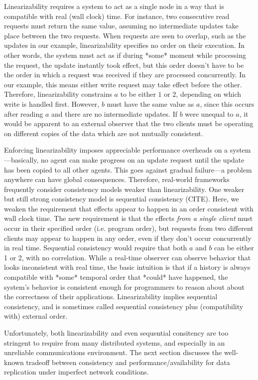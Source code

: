 Linearizability requires a system to act as a single node in a way
that is compatible with real (wall clock) time. For instance, two
consecutive read requests must return the same value, assuming no
intermediate updates take place between the two requests. When
requests are seen to overlap, such as the updates in our example,
linearizability specifies no order on their execution. In other words,
the system must act as if during *some* moment while processing the
request, the update instantly took effect, but this order doesn't have
to be the order in which a request was received if they are processed
concurrently. In our example, this means either write request may take
effect before the other. Therefore, linearizability constrains $a$ to
be either $1$ or $2$, depending on which write is handled
first. However, $b$ must have the same value as $a$, since this occurs
after reading $a$ and there are no intermediate updates. If $b$ were
unequal to $a$, it would be apparent to an external observer that the
two clients must be operating on different copies of the data which
are not mutually consistent.

Enforcing linearizability imposes appreciable performance overheads on
a system---basically, no agent can make progress on an update request
until the update has been copied to all other agents. This goes
against gradual failure---a problem anywhere can have global
consequences. Therefore, real-world frameworks frequently consider
consistency models weaker than linearizability. One weaker but still
strong consistency model is sequential consistency (CITE). Here, we
weaken the requirement that effects appear to happen in an order
consistent with wall clock time. The new requirement is that the
effects \emph{from a single client} must occur in their specified
order (i.e. program order), but requests from two different clients
may appear to happen in any order, even if they don't occur
concurrently in real time. Sequential consistency would require that
both $a$ and $b$ can be either 1 or 2, with no correlation. While a
real-time observer can observe behavior that looks inconsistent with
real time, the basic intuition is that if a history is always
compatible with *some* temporal order that *could* have happened, the
system's behavior is consistent enough for programmers to reason about
about the correctness of their applications. Linearizability implies
sequential consistency, and is sometimes called sequential consistency
plus (compatibility with) external order.

Unfortunately, both linearizability and even sequential consitency are
too stringent to require from many distributed systems, and especially
in an unreliable communications environment. The next section
discusses the well-known tradeoff between consistency and
performance/availability for data replication under imperfect network
conditions.

